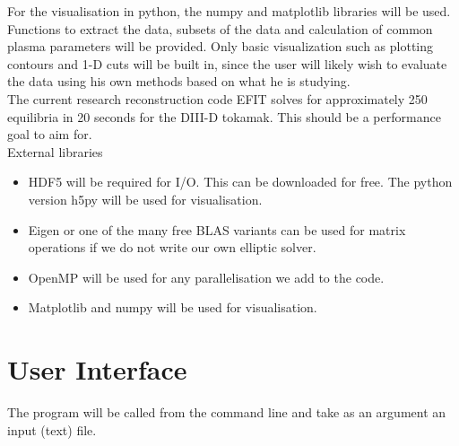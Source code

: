 \documentclass[paper=a4, fontsize=11pt]{scrartcl} %
\begin{document}
For the visualisation in python, the numpy and matplotlib libraries will be used. Functions to extract the data, subsets of the data and calculation of common plasma parameters will be provided. Only basic visualization such as plotting contours and 1-D cuts will be built in, since the user will likely wish to evaluate the data using his own methods based on what he is studying. \\

The current research reconstruction code EFIT solves for approximately 250 equilibria in 20 seconds for the DIII-D tokamak. This should be a performance goal to aim for. \\

External libraries
\begin{itemize}
\item HDF5 will be required for I/O. This can be downloaded for free. The python version h5py will be used for visualisation.
\item Eigen or one of the many free BLAS variants can be used for matrix operations if we do not write our own elliptic solver.
\item OpenMP will be used for any parallelisation we add to the code. 
\item Matplotlib and numpy will be used for visualisation.
\end{itemize}


\section{User Interface}

The program will be called from the command line and take as an argument an input (text) file. 
\end{document}
